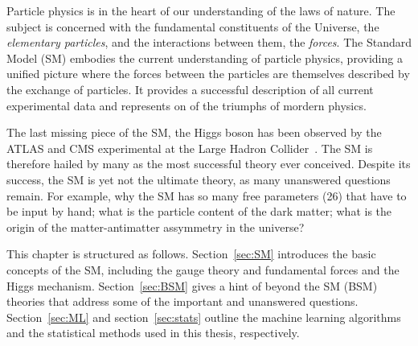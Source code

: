 \label{sec:SM:intro}
Particle physics is in the heart of our understanding of
the laws of nature. 
The subject is concerned with the fundamental constituents of the
Universe, the \textit{elementary particles}, and the interactions between them, 
the \textit{forces}. 
The Standard Model (SM) embodies the current understanding of
particle physics, providing a unified picture where the forces between the particles
are themselves described by the exchange of particles. It provides a successful description
of all current experimental data and represents on of the triumphs of mordern physics.

The last missing piece of the SM, the Higgs boson has been observed 
by the ATLAS and CMS experimental at the 
Large Hadron Collider~\cite{HIGG-2012-27,CMS-HIG-12-028}. 
The SM is therefore hailed by many as the most successful theory 
ever conceived. Despite its success, the SM is yet not the ultimate  
theory, as many unanswered questions remain. For example, why the SM
has so many free parameters (26) that have to be input by hand; 
what is the particle content of the dark matter; 
what is the origin of the matter-antimatter assymmetry in the universe?

This chapter is structured as follows. 
Section~\ref{sec:SM} introduces the basic concepts of the SM, including the
gauge theory and fundamental forces and the Higgs mechanism. 
Section~\ref{sec:BSM} gives a hint of beyond the SM (BSM) 
theories that address some of the important and unanswered questions. 
Section~\ref{sec:ML} and section~\ref{sec:stats} outline the machine learning algorithms 
and the statistical methods used in this thesis, respectively.
